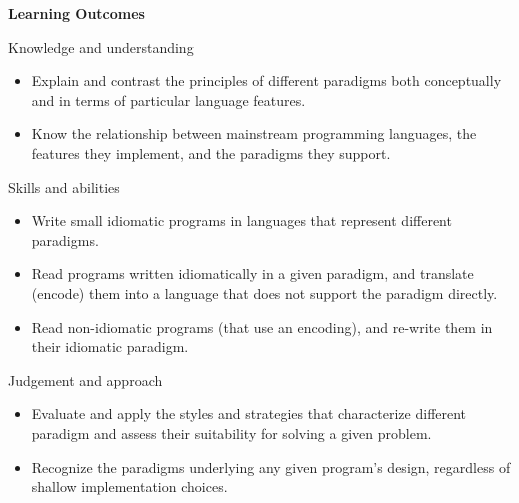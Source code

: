 \documentclass[utf8,compress,hyperref]{beamer}
\begin{document}
\begin{frame}

\textbf{Learning Outcomes}

\scriptsize
Knowledge and understanding
\begin{itemize}
\item Explain and contrast the principles of different paradigms both
conceptually and in terms of particular language features.
\item Know the relationship between mainstream programming languages, the
features they implement, and the paradigms they support.
\end{itemize}


Skills and abilities

\begin{itemize}
\item Write small idiomatic programs in languages that represent
  different paradigms.

\item Read programs written idiomatically in a given paradigm, and
  translate (encode) them into a language that does not support the
  paradigm directly.

\item Read non-idiomatic programs (that use an encoding), and re-write
  them in their idiomatic paradigm.
\end{itemize}


Judgement and approach
\begin{itemize}
\item 
  Evaluate and apply the styles and strategies that characterize
  different paradigm and assess their suitability for solving a given
  problem.

\item 
  Recognize the paradigms underlying any given program's design,
  regardless of shallow implementation choices.
\end{itemize}
\end{frame}
\end{document}
